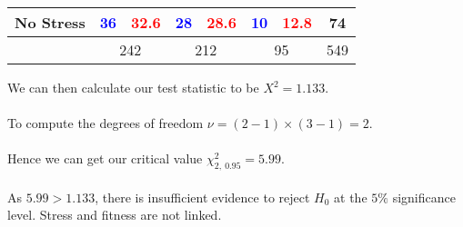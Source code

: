\documentclass{report}
\begin{document}
{\begin{center}
\begin{tabular}{l | c c c c c c | c}
                        No Stress & \textcolor{blue}{36}  & \textcolor{red}{32.6}  & \textcolor{blue}{28}  & \textcolor{red}{28.6}  & \textcolor{blue}{10} & \textcolor{red}{12.8} & 74  \\
                        \hline
                        & \multicolumn{2}{c}{242} & \multicolumn{2}{c}{212} & \multicolumn{2}{c}{95} & 549 \\
                    \end{tabular}
                \end{center}
                We can then calculate our test statistic to be $X^2 = 1.133$.
                \\
                \\ To compute the degrees of freedom $\nu = (2 - 1) \times (3 - 1) = 2$.
                \\
                \\ Hence we can get our critical value $\chi^2_{2, \ 0.95} = 5.99$.
                \\
                \\ As $5.99 > 1.133$, there is insufficient evidence to reject $H_0$ at the $5\%$ significance level. Stress and fitness are not linked.
            }
            
\end{document}
